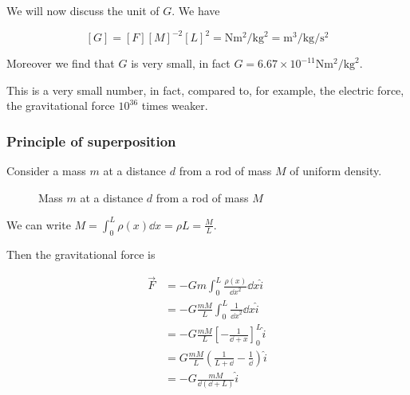 \documentclass[10pt]{extarticle}
\begin{document}
We will now discuss the unit of $G$.
We have

$$
    [G] = [F][M]^{-2}[L]^2 = \si{\newton \meter \squared \per \kilogram \squared} = \si{\meter \cubed \per \kilogram \per \second \squared}
$$

Moreover we find that $G$ is very small, in fact $G = 6.67 \times 10^{-11} \si{\newton \meter \squared \per \kilogram \squared}$.

This is a very small number, in fact, compared to, for example, the electric force, the gravitational force $10^{36}$ times weaker.

\subsubsection{Principle of superposition}

Consider a mass $m$ at a distance $d$ from a rod of mass $M$ of uniform density.

\begin{figure}[H]
    \centering

    \caption{Mass $m$ at a distance $d$ from a rod of mass $M$}
    \label{fig:mass_rod}
\end{figure}

We can write $M = \int_0^L \rho(x) \dd{x} = \rho L = \frac{M}{L}$.

Then the gravitational force is

\begin{align*}
    \vec F & = - G m \int_0^L \frac{\rho(x)}{{\dd{} x}^2}  \dd{x} \hat i                   \\
           & = - G \frac{m M}{L} \int_0^L \frac{1}{{\dd{} x}^2}  \dd{x} \hat i             \\
           & = - G \frac{m M}{L} \left[ - \frac{1}{\dd{} + x} \right]_0^L \hat i           \\
           & = G \frac{m M}{L} \left( \frac{1}{L + \dd{}} - \frac{1}{\dd{}} \right) \hat i \\
           & = -G \frac{m M}{\dd{} (\dd{} + L)} \hat i
\end{align*}
\end{document}
